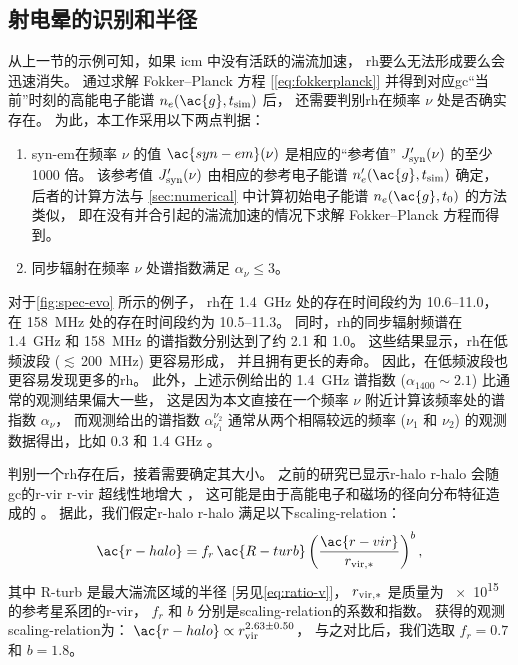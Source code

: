 \subsection{射电晕的识别和半径}
\label{sec:halo-size}

从上一节的示例可知，如果 \ac{icm} 中没有活跃的湍流加速，
\ac{rh}要么无法形成要么会迅速消失。
通过求解 Fokker--Planck 方程 [\autoref{eq:fokkerplanck}]
并得到对应\ac{gc}\enquote{当前}时刻的高能电子能谱 $n_e(\ac{g}, t_{\R{sim}})$ 后，
还需要判别\ac{rh}在频率 $\nu$ 处是否确实存在。
为此，本工作采用以下两点判据：
\begin{enumerate}
  \item \acl{syn-em}在频率 $\nu$ 的值 $\ac{syn-em}(\nu)$
    是相应的\enquote{参考值} $J'_{\mathrm{syn}}(\nu)$ 的至少 1000 倍。
    该参考值 $J'_{\mathrm{syn}}(\nu)$ 由相应的参考电子能谱
    $n'_e(\ac{g}, t_{\R{sim}})$ 确定，
    后者的计算方法与 \autoref{sec:numerical} 中计算初始电子能谱
    $n_e(\ac{g}, t_0)$ 的方法类似，
    即在没有并合引起的湍流加速的情况下求解 Fokker--Planck 方程而得到。

  \item 同步辐射在频率 $\nu$ 处谱指数满足 $\alpha_{\nu} \le 3$。
\end{enumerate}

对于\autoref{fig:spec-evo} 所示的例子，
\ac{rh}在 \SI{1.4}{\GHz} 处的存在时间段约为 \SIrange{10.6}{11.0}{\Gyr}，
在 \SI{158}{\MHz} 处的存在时间段约为 \SIrange{10.5}{11.3}{\Gyr}。
同时，\ac{rh}的同步辐射频谱在 \SI{1.4}{\GHz} 和 \SI{158}{\MHz}
的谱指数分别达到了约 2.1 和 1.0。
这些结果显示，\ac{rh}在低频波段 ($\lesssim$\,\SI{200}{\MHz}) 更容易形成，
并且拥有更长的寿命。
因此，在低频波段也更容易发现更多的\ac{rh}。
此外，上述示例给出的 \SI{1.4}{\GHz} 谱指数 ($\alpha_{1400} \sim 2.1$)
比通常的观测结果\cite{feretti2012}偏大一些，
这是因为本文直接在一个频率 $\nu$ 附近计算该频率处的谱指数 $\alpha_{\nu}$，
而观测给出的谱指数 $\alpha_{\nu_1}^{\nu_2}$ 通常从两个相隔较远的频率
($\nu_1$ 和 $\nu_2$) 的观测数据得出，比如 0.3 和 1.4 GHz \cite{feretti2012}。

判别一个\ac{rh}存在后，接着需要确定其大小。
之前的研究已显示\acl{r-halo} \ac{r-halo}
会随\ac{gc}的\acl{r-vir} \ac{r-vir} 超线性地增大 \cite{cassano2007,basu2012}，
这可能是由于高能电子和磁场的径向分布特征造成的 \cite{dolag2002}。
据此，我们假定\acl{r-halo} \ac{r-halo} 满足以下\ac{scaling-relation}：
\begin{equation}
  \label{eq:r-halo}
  \ac{r-halo} = f_r \,\ac{R-turb}
    \left( \frac{\ac{r-vir}}{r_{\R{vir,*}}} \right)^b ,
\end{equation}
其中
\ac{R-turb} 是最大湍流区域的半径 [另见\autoref{eq:ratio-v}]，
$r_{\mathrm{vir,*}}$ 是质量为 \SI{e15}{\solarmass} 的参考星系团的\acl{r-vir}，
$f_r$ 和 $b$ 分别是\ac{scaling-relation}的系数和指数。
 获得的观测\ac{scaling-relation}为：
$\ac{r-halo} \propto r_{\R{vir}}^{2.63 \pm 0.50}$，
与之对比后，我们选取 $f_r = 0.7$ 和 $b = 1.8$。

